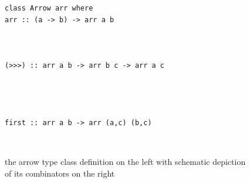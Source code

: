 \begin{figure}[h]
\begin{minipage}{\textwidth}
\begin{minipage}{0.5\textwidth}
\begin{lstlisting}[frame=htrbl]
class Arrow arr where
arr :: (a -> b) -> arr a b



(>>>) :: arr a b -> arr b c -> arr a c




first :: arr a b -> arr (a,c) (b,c)
\end{lstlisting}
\end{minipage}
~~~~
\begin{minipage}{0.25\textwidth}
	\begin{center}
	\end{center}
\end{minipage}
\end{minipage}
\caption{the arrow type class definition on the left with schematic depiction of its combinators on the right}
\end{figure}

